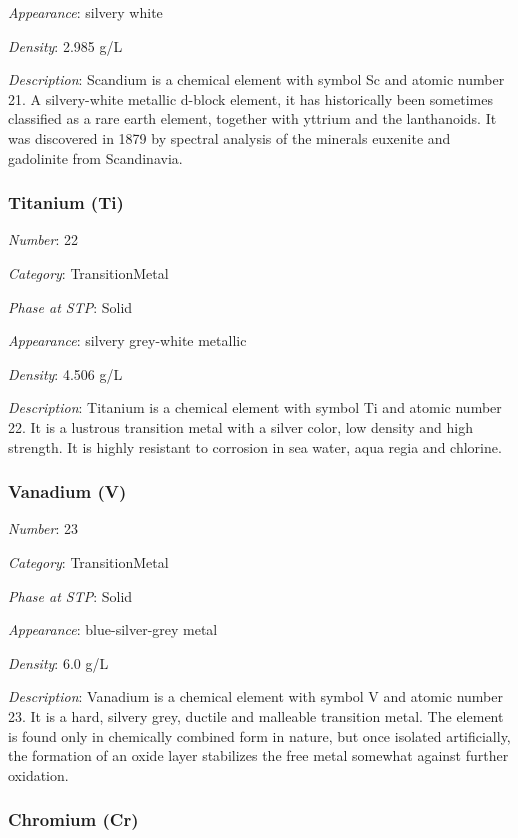 \documentclass{article}
\begin{document}
\textit{Appearance}: silvery white

\textit{Density}: 2.985 g/L

\textit{Description}: Scandium is a chemical element with symbol Sc and atomic number 21. A silvery-white metallic d-block element, it has historically been sometimes classified as a rare earth element, together with yttrium and the lanthanoids. It was discovered in 1879 by spectral analysis of the minerals euxenite and gadolinite from Scandinavia.

\hypertarget{subsubsection::Ti}{}\subsubsection{Titanium (Ti)}

\textit{Number}: 22

\textit{Category}: TransitionMetal

\textit{Phase at STP}: Solid

\textit{Appearance}: silvery grey-white metallic

\textit{Density}: 4.506 g/L

\textit{Description}: Titanium is a chemical element with symbol Ti and atomic number 22. It is a lustrous transition metal with a silver color, low density and high strength. It is highly resistant to corrosion in sea water, aqua regia and chlorine.

\hypertarget{subsubsection::V}{}\subsubsection{Vanadium (V)}

\textit{Number}: 23

\textit{Category}: TransitionMetal

\textit{Phase at STP}: Solid

\textit{Appearance}: blue-silver-grey metal

\textit{Density}: 6.0 g/L

\textit{Description}: Vanadium is a chemical element with symbol V and atomic number 23. It is a hard, silvery grey, ductile and malleable transition metal. The element is found only in chemically combined form in nature, but once isolated artificially, the formation of an oxide layer stabilizes the free metal somewhat against further oxidation.

\hypertarget{subsubsection::Cr}{}\subsubsection{Chromium (Cr)}
\end{document}

